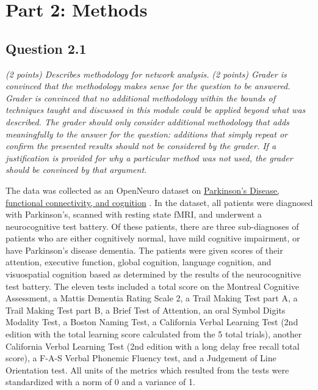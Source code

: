 \documentclass[12pt]{article}
\begin{document}
\section{Part 2: Methods}

\subsection{Question 2.1}
\textit{ (2 points) Describes methodology for network analysis.}
\textit{(2 points) Grader is convinced that the methodology makes sense for the question to be answered. Grader is convinced that no additional methodology within the bounds of techniques taught and discussed in this module could be applied beyond what was described. The grader should only consider additional methodology that adds meaningfully to the answer for the question: additions that simply repeat or confirm the presented results should not be considered by the grader. If a justification is provided for why a particular method was not used, the grader should be convinced by that argument. }

The data was collected as an OpenNeuro dataset on \href{https://openneuro.org/datasets/ds004392/versions/1.0.0}{Parkinson's Disease, functional connectivity, and cognition} \cite{ds004392:1.0.0}. In the dataset, all patients were diagnosed with Parkinson's, scanned with resting state fMRI, and underwent a neurocognitive test battery. Of these patients, there are three sub-diagnoses of patients who are either cognitively normal, have mild cognitive impairment, or have Parkinson's disease dementia. The patients were given scores of their attention, executive function, global cognition, language cognition, and visuospatial cognition based as determined by the results of the neurocognitive test battery. The eleven tests included a total score on the Montreal Cognitive Assessment, a Mattis Dementia Rating Scale 2, a Trail Making Test part A, a Trail Making Test part B, a Brief Test of Attention, an oral Symbol Digits Modality Test, a Boston Naming Test, a California Verbal Learning Test (2nd edition with the total learning score calculated from the 5 total trials), another California Verbal Learning Test (2nd edition with a long delay free recall total score), a F-A-S Verbal Phonemic Fluency test, and a Judgement of Line Orientation test. All units of the metrics which resulted from the tests were standardized with a norm of 0 and a variance of 1.
\end{document}
